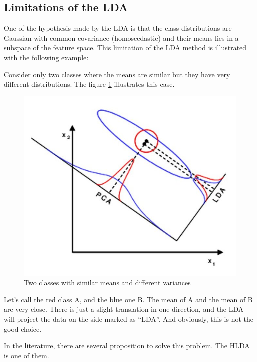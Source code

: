 \subsection{Limitations of the LDA}
\label{sec:limitations-lda}

One of the hypothesis made by the LDA is that the class distributions
are Gaussian with common covariance (homoscedastic) and their means
lies in a subspace of the feature space. This limitation of the LDA
method is illustrated with the following example:

Consider only two classes where the means are similar but they have very
different distributions. The figure \ref{fig:lda-fail} illustrates this case.

\begin{figure}[h]
  \centering
  \includegraphics[scale=0.5]{img/limitation_lda}
  \caption{Two classes with similar means and different variances}
  \label{fig:lda-fail}
\end{figure}

Let's call the red class A, and the blue one B. The mean
of A and the mean of B are very close. There is just a slight
translation in one direction, and the LDA will project the data on the
side marked as ``LDA''. And obviously, this is not the good choice.

In the literature, there are several proposition to solve this problem.
The HLDA is one of them.
